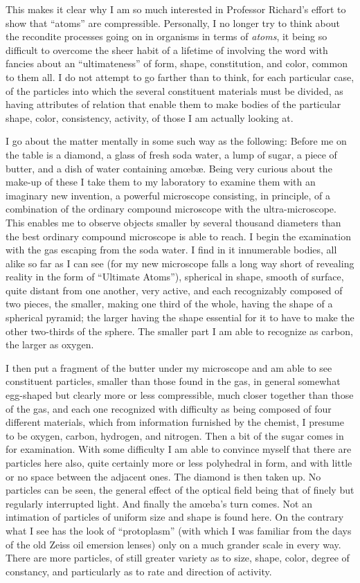 \documentclass[a4paper, 11pt, oneside, polutonikogreek, english]{article}
\begin{document}
This makes it clear why I am so much interested in Professor Richard's effort to show that ``atoms'' are compressible. Personally, I no longer try to think about the recondite processes going on in organisms in terms of \emph{atoms}, it being so difficult to overcome the sheer habit of a lifetime of involving the word with fancies about an ``ultimateness'' of form, shape, constitution, and color, common to them all. I do not attempt to go farther than to think, for each particular case, of the particles into which the several constituent materials must be divided, as having attributes of relation that enable them to make bodies of the particular shape, color, consistency, activity, of those I am actually looking at.

I go about the matter mentally in some such way as the following: Before me on the table is a diamond, a glass of fresh soda water, a lump of sugar, a piece of butter, and a dish of water containing amœbæ. Being very curious about the make-up of these I take them to my laboratory to examine them with an imaginary new invention, a powerful microscope consisting, in principle, of a combination of the ordinary compound microscope with the ultra-microscope. This enables me to observe objects smaller by several thousand diameters than the best ordinary compound microscope is able to reach. I begin the examination with the gas escaping from the soda water. I find in it innumerable bodies, all alike so far as I can see (for my new microscope falls a long way short of revealing reality in the form of ``Ultimate Atoms''), spherical in shape, smooth of surface, quite distant from one another, very active, and each recognizably composed of two pieces, the smaller, making one third of the whole, having the shape of a spherical pyramid; the larger having the shape essential for it to have to make the other two-thirds of the sphere. The smaller part I am able to recognize as carbon, the larger as oxygen.

I then put a fragment of the butter under my microscope and am able to see constituent particles, smaller than those found in the gas, in general somewhat egg-shaped but clearly more or less compressible, much closer together than those of the gas, and each one recognized with difficulty as being composed of four different materials, which from information furnished by the chemist, I presume to be oxygen, carbon, hydrogen, and nitrogen. Then a bit of the sugar comes in for examination. With some difficulty I am able to convince myself that there are particles here also, quite certainly more or less polyhedral in form, and with little or no space between the adjacent ones. The diamond is then taken up. No particles can be seen, the general effect of the optical field being that of finely but regularly interrupted light. And finally the amœba's turn comes. Not an intimation of particles of uniform size and shape is found here. On the contrary what I see has the look of ``protoplasm'' (with which I was familiar from the days of the old Zeiss oil emersion lenses) only on a much grander scale in every way. There are more particles, of still greater variety as to size, shape, color, degree of constancy, and particularly as to rate and direction of activity.
\end{document}
